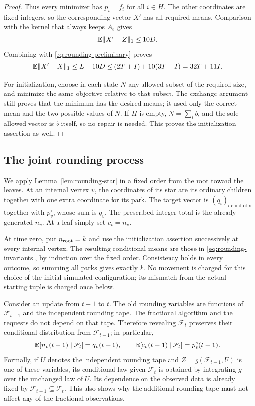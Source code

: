 \begin{proof}
Thus every minimizer has $p_i=f_i$ for all $i\in H$.  The other coordinates
are fixed integers, so the corresponding vector $X'$ has all required means.
Comparison with the kernel that always keeps $A_0$ gives
\[
                       \mathbb E\|X'-Z\|_1\le10D.
\]
Combining with \eqref{eq:rounding-preliminary} proves
\[
 \mathbb E\|X'-X\|_1\le L+10D
       \le(2T+I)+10(3T+I)=32T+11I.
\]

For initialization, choose in each state $N$ any allowed subset of the
required size, and minimize the same objective relative to that subset.
The exchange argument still proves that the minimum has the desired means;
it used only the correct mean and the two possible values of $N$.
If $H$ is empty, $N=\sum_i b_i$ and the sole allowed vector is $b$ itself,
so no repair is needed.  This proves the initialization assertion as well.
\end{proof}

\subsection{The joint rounding process}

We apply Lemma~\ref{lem:rounding-star} in a fixed order from the root toward
the leaves.  At an internal vertex $v$, the coordinates of its star are its
ordinary children together with one extra coordinate for its park.  The
target vector is $(q_i)_{i\text{ child of }v}$ together with $p_v^\circ$,
whose sum is $q_v$.  The prescribed integer total is the already generated
$n_v$.  At a leaf simply set $c_v=n_v$.

At time zero, put $n_{\rm root}=k$ and use the initialization assertion
successively at every internal vertex.  The resulting conditional means are
those in \eqref{eq:rounding-invariants}, by induction over the fixed order.
Consistency holds in every outcome, so summing all parks gives exactly $k$.
No movement is charged for this choice of the initial simulated configuration;
its mismatch from the actual starting tuple is charged once below.

Consider an update from $t-1$ to $t$.  The old rounding variables are functions
of $\mathcal F_{t-1}$ and the independent rounding tape.  The fractional
algorithm and the requests do not depend on that tape.  Therefore revealing
$\mathcal F_t$ preserves their conditional distribution from
$\mathcal F_{t-1}$; in particular,
\begin{equation}\label{eq:old-rounding-means}
 \mathbb E[n_v(t-1)\mid\mathcal F_t]=q_v(t-1),
 \qquad
 \mathbb E[c_v(t-1)\mid\mathcal F_t]=p_v^\circ(t-1).
\end{equation}
Formally, if $U$ denotes the independent rounding tape and
$Z=g(\mathcal F_{t-1},U)$ is one of these variables, its conditional law given
$\mathcal F_t$ is obtained by integrating $g$ over the unchanged law of $U$.
Its dependence on the observed data is already fixed by
$\mathcal F_{t-1}\subseteq\mathcal F_t$.  This also shows why the additional
rounding tape must not affect any of the fractional observations.

